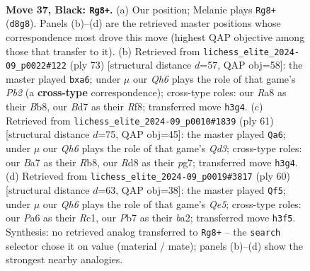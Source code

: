 \documentclass[11pt]{article}
\begin{document}
\clearpage

\begin{figure}[p]\centering
\begin{subfigure}{0.46\textwidth}\centering
\resizebox{\linewidth}{!}{%
\newchessgame
\chessboard[
  setfen={r2r3k/bp1b1Q2/p3p2p/8/8/BP1p3q/PR3P1P/4R1K1 b - - 3 37},
  showmover=false,
  pgfstyle=straightmove, color=movearrow, markmove={d8-g8}
]}
\caption{}
\end{subfigure}\hfill
\begin{subfigure}{0.46\textwidth}\centering
\resizebox{\linewidth}{!}{%
\newchessgame
\chessboard[
  setfen={1b1r1r1k/1p3qpp/P1p5/1p6/1Q3P2/5R1P/1P3BP1/4R2K b - - 0 37},
  showmover=false,
  pgfstyle=straightmove, color=movearrow, markmove={b7-a6}
]}
\caption{}
\end{subfigure}
\\[4pt]
\begin{subfigure}{0.46\textwidth}\centering
\resizebox{\linewidth}{!}{%
\newchessgame
\chessboard[
  setfen={1r2r1k1/2p3P1/3q3p/p2p4/8/1P2b2Q/PBB3PP/5R1K b - - 0 31},
  showmover=false,
  pgfstyle=straightmove, color=movearrow, markmove={d6-a6}
]}
\caption{}
\end{subfigure}\hfill
\begin{subfigure}{0.46\textwidth}\centering
\resizebox{\linewidth}{!}{%
\newchessgame
\chessboard[
  setfen={k2r4/pp6/1q6/4Q1p1/4B2p/7P/bP1r1PP1/2R1R1K1 w - - 1 31},
  showmover=false,
  pgfstyle=straightmove, color=movearrow, markmove={e5-f5}
]}
\caption{}
\end{subfigure}
\caption{\textbf{Move 37, Black: \texttt{Rg8+}.} (a) Our position; Melanie plays \texttt{Rg8+} (\texttt{d8g8}). Panels (b)--(d) are the retrieved master positions whose correspondence most drove this move (highest QAP objective among those that transfer to it). (b) Retrieved from \texttt{lichess\_elite\_2024-09\_p0022\#122} (ply 73) [structural distance $d$=57, QAP obj=58]: the master played \texttt{bxa6}; under $\mu$ our \emph{Qh6} plays the role of that game's \emph{Pb2} (a \textbf{cross-type} correspondence); cross-type roles: our \emph{R}a8 as their \emph{B}b8, our \emph{B}d7 as their \emph{R}f8; transferred move \texttt{h3g4}. (c) Retrieved from \texttt{lichess\_elite\_2024-09\_p0010\#1839} (ply 61) [structural distance $d$=75, QAP obj=45]: the master played \texttt{Qa6}; under $\mu$ our \emph{Qh6} plays the role of that game's \emph{Qd3}; cross-type roles: our \emph{B}a7 as their \emph{R}b8, our \emph{R}d8 as their \emph{p}g7; transferred move \texttt{h3g4}. (d) Retrieved from \texttt{lichess\_elite\_2024-09\_p0019\#3817} (ply 60) [structural distance $d$=63, QAP obj=38]: the master played \texttt{Qf5}; under $\mu$ our \emph{Qh6} plays the role of that game's \emph{Qe5}; cross-type roles: our \emph{P}a6 as their \emph{R}c1, our \emph{P}b7 as their \emph{b}a2; transferred move \texttt{h3f5}. Synthesis: no retrieved analog transferred to \texttt{Rg8+} -- the \texttt{search} selector chose it on value (material / mate); panels (b)--(d) show the strongest nearby analogies.}
\label{fig:thought-m73}
\end{figure}
\end{document}
